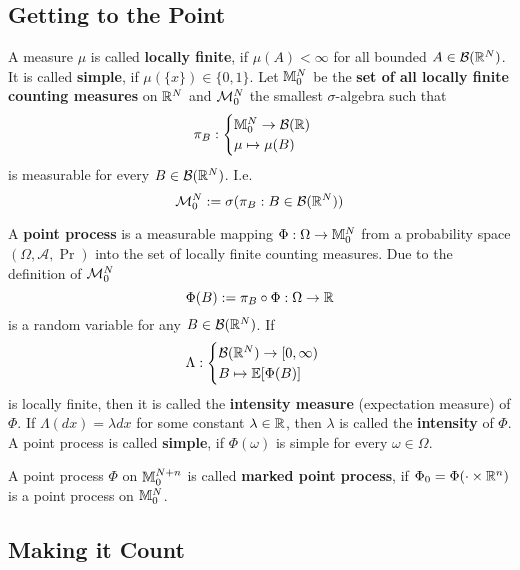 \subsection{Getting to the Point}

A measure \(\mu\) is called \textbf{locally finite}, if \(\mu(A) < \infty\) for
all bounded \(A\in\borel(\real^\dimension)\). It is called \textbf{simple}, if
\(\mu(\{x\})\in\{0,1\}\).
Let \(\locFiniteMeasure\) be the \textbf{set of all locally finite counting measures}
on \(\real^\dimension\) and \(\locFiniteMeasAlg\) the smallest \(\sigma\)-algebra
such that
\[
	\pi_B : \begin{cases}
		\locFiniteMeasure \to \borel(\real)\\
		\mu \mapsto \mu(B)
	\end{cases}
\]
is measurable for every \(B\in\borel(\real^\dimension)\). I.e.
\[
	\locFiniteMeasAlg := \sigma(\pi_B : B\in\borel(\real^\dimension))
\]

\begin{definition}
	A \textbf{point process} is a measurable mapping \(\Phi:\Omega\to\locFiniteMeasure\)
	from a probability space \((\Omega, \mathcal{A}, \Pr)\) into the set of
	locally finite counting measures. Due to the definition of \(\locFiniteMeasAlg\)
	\[
		\Phi(B) := \pi_B\circ \Phi : \Omega \to \real
	\]
	is a random variable for any \(B\in\borel(\real^\dimension)\). If
	\[
		\Lambda:\begin{cases}
			\borel(\real^\dimension)\to [0,\infty)\\
			B \mapsto \E[\Phi(B)]
		\end{cases}
	\]
	is locally finite, then it is called the \textbf{intensity measure}
	(expectation measure) of \(\Phi\).  If \(\Lambda(dx) = \lambda dx\) for some
	constant \(\lambda\in\real\), then \(\lambda\) is called the
	\textbf{intensity} of \(\Phi\).
	A point process is called \textbf{simple}, if \(\Phi(\omega)\) is simple
	for every \(\omega\in\Omega\).
\end{definition}

\begin{definition}
	A point process \(\Phi\) on \(\locFiniteMeasure[\dimension+n]\) is called
	\textbf{marked point process}, if \(\Phi_0 = \Phi(\cdot \times \real^n)\)
	is a point process on \(\locFiniteMeasure\).
\end{definition}

\subsection{Making it Count}

